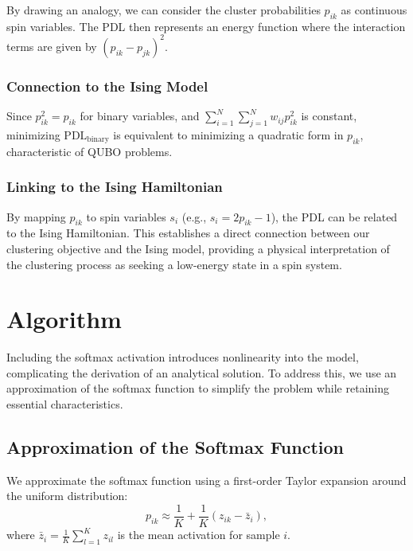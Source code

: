 \documentclass[journal]{IEEEtran}
\begin{document}
By drawing an analogy, we can consider the cluster probabilities \( p_{ik} \) as continuous spin variables. The PDL then represents an energy function where the interaction terms are given by \( (p_{ik} - p_{jk})^2 \).


\subsubsection{Connection to the Ising Model}

Since \( p_{ik}^2 = p_{ik} \) for binary variables, and \( \sum_{i=1}^{N} \sum_{j=1}^{N} w_{ij} p_{ik}^2 \) is constant, minimizing \( \text{PDL}_{\text{binary}} \) is equivalent to minimizing a quadratic form in \( p_{ik} \), characteristic of QUBO problems.

\subsubsection{Linking to the Ising Hamiltonian}

By mapping \( p_{ik} \) to spin variables \( s_i \) (e.g., \( s_i = 2 p_{ik} - 1 \)), the PDL can be related to the Ising Hamiltonian. This establishes a direct connection between our clustering objective and the Ising model, providing a physical interpretation of the clustering process as seeking a low-energy state in a spin system.

\section{Algorithm}

Including the softmax activation introduces nonlinearity into the model, complicating the derivation of an analytical solution. To address this, we use an approximation of the softmax function to simplify the problem while retaining essential characteristics.

\subsection{Approximation of the Softmax Function}

We approximate the softmax function using a first-order Taylor expansion around the uniform distribution:
\begin{equation} \label{eq8}
p_{ik} \approx \frac{1}{K} + \frac{1}{K} \left( z_{ik} - \bar{z}_i \right),
\end{equation}
where \( \bar{z}_i = \frac{1}{K} \sum_{l=1}^{K} z_{il} \) is the mean activation for sample \( i \).
\end{document}

